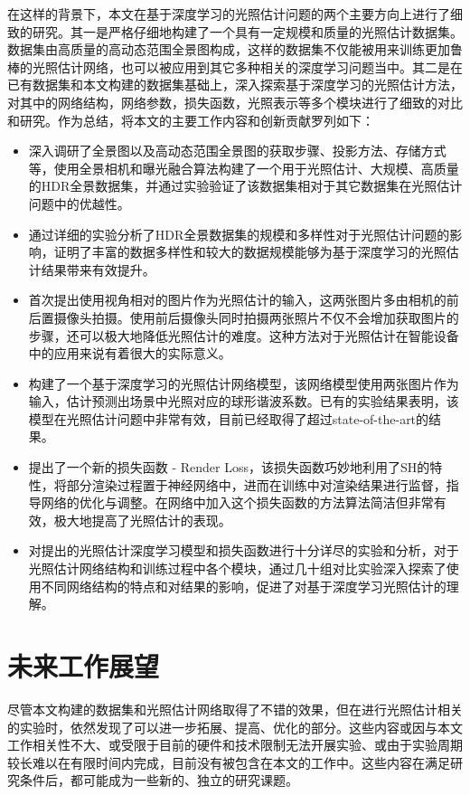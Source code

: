 在这样的背景下，本文在基于深度学习的光照估计问题的两个主要方向上进行了细致的研究。其一是严格仔细地构建了一个具有一定规模和质量的光照估计数据集。数据集由高质量的高动态范围全景图构成，这样的数据集不仅能被用来训练更加鲁棒的光照估计网络，也可以被应用到其它多种相关的深度学习问题当中。其二是在已有数据集和本文构建的数据集基础上，深入探索基于深度学习的光照估计方法，对其中的网络结构，网络参数，损失函数，光照表示等多个模块进行了细致的对比和研究。作为总结，将本文的主要工作内容和创新贡献罗列如下：
\begin{itemize}
    \item 深入调研了全景图以及高动态范围全景图的获取步骤、投影方法、存储方式等，使用全景相机和曝光融合算法构建了一个用于光照估计、大规模、高质量的HDR全景数据集，并通过实验验证了该数据集相对于其它数据集在光照估计问题中的优越性。
    \item 通过详细的实验分析了HDR全景数据集的规模和多样性对于光照估计问题的影响，证明了丰富的数据多样性和较大的数据规模能够为基于深度学习的光照估计结果带来有效提升。
    \item 首次提出使用视角相对的图片作为光照估计的输入，这两张图片多由相机的前后置摄像头拍摄。使用前后摄像头同时拍摄两张照片不仅不会增加获取图片的步骤，还可以极大地降低光照估计的难度。这种方法对于光照估计在智能设备中的应用来说有着很大的实际意义。
    \item 构建了一个基于深度学习的光照估计网络模型，该网络模型使用两张图片作为输入，估计预测出场景中光照对应的球形谐波系数。已有的实验结果表明，该模型在光照估计问题中非常有效，目前已经取得了超过state-of-the-art的结果。
    \item 提出了一个新的损失函数 - Render Loss，该损失函数巧妙地利用了SH的特性，将部分渲染过程置于神经网络中，进而在训练中对渲染结果进行监督，指导网络的优化与调整。在网络中加入这个损失函数的方法算法简洁但非常有效，极大地提高了光照估计的表现。
    \item 对提出的光照估计深度学习模型和损失函数进行十分详尽的实验和分析，对于光照估计网络结构和训练过程中各个模块，通过几十组对比实验深入探索了使用不同网络结构的特点和对结果的影响，促进了对基于深度学习光照估计的理解。
\end{itemize}

\section{未来工作展望}
尽管本文构建的数据集和光照估计网络取得了不错的效果，但在进行光照估计相关的实验时，依然发现了可以进一步拓展、提高、优化的部分。这些内容或因与本文工作相关性不大、或受限于目前的硬件和技术限制无法开展实验、或由于实验周期较长难以在有限时间内完成，目前没有被包含在本文的工作中。这些内容在满足研究条件后，都可能成为一些新的、独立的研究课题。

